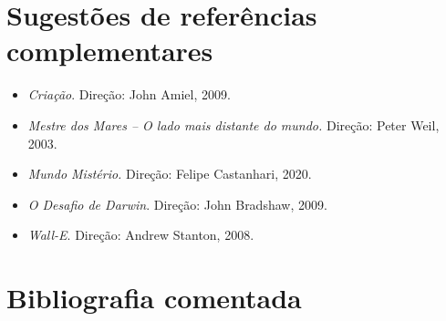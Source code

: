 \documentclass[11pt]{extarticle}
\begin{document}
\section{Sugestões de referências complementares}

\begin{itemize}
\item \emph{Criação}. Direção: John Amiel, 2009.

\item \emph{Mestre dos Mares -- O lado mais distante do mundo.} Direção: Peter Weil, 2003.

\item \emph{Mundo Mistério.} Direção: Felipe Castanhari, 2020.

\item \emph{O Desafio de Darwin}. Direção: John Bradshaw, 2009.

\item \emph{Wall-E}. Direção: Andrew Stanton, 2008.
\end{itemize}



\section{Bibliografia comentada}
\end{document}

